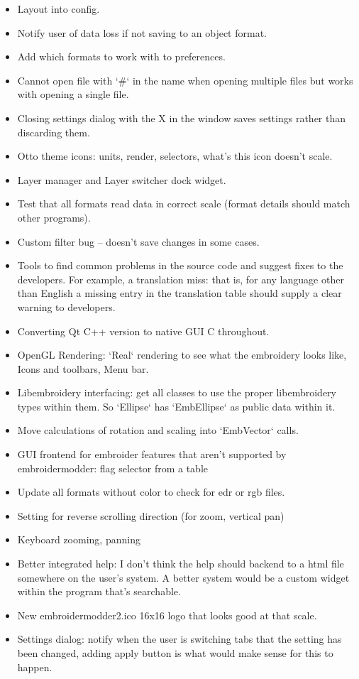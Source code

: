 \documentclass[10pt]{report}
\begin{document}
\begin{itemize}
  \item Layout into config.
  \item Notify user of data loss if not saving to an object format.
  \item Add which formats to work with to preferences.
  \item Cannot open file with `\#` in the name when opening multiple files but works with opening a single file.
  \item Closing settings dialog with the X in the window saves settings rather than discarding them.
  \item Otto theme icons: units, render, selectors, what's this icon doesn't scale.
  \item Layer manager and Layer switcher dock widget.
  \item Test that all formats read data in correct scale (format details should match other programs).
  \item Custom filter bug -- doesn't save changes in some cases.
  \item Tools to find common problems in the source code and suggest fixes to the developers. For example, a translation miss: that is, for any language other than English a missing entry in the translation table should supply a clear warning to developers.
  \item Converting Qt C++ version to native GUI C throughout.
  \item OpenGL Rendering: `Real` rendering to see what the embroidery looks like, Icons and toolbars, Menu bar.
  \item Libembroidery interfacing: get all classes to use the proper libembroidery types within them. So `Ellipse` has `EmbEllipse` as public data within it.
  \item Move calculations of rotation and scaling into `EmbVector` calls.
  \item GUI frontend for embroider features that aren't supported by embroidermodder: flag selector from a table
  \item Update all formats without color to check for edr or rgb files.
  \item Setting for reverse scrolling direction (for zoom, vertical pan)
  \item Keyboard zooming, panning
  \item Better integrated help: I don't think the help should backend to a html file somewhere on the user's system. A better system would be a custom widget within the program that's searchable.
  \item New embroidermodder2.ico 16x16 logo that looks good at that scale.
  \item Settings dialog: notify when the user is switching tabs that the setting has been changed, adding apply button is what would make sense for this to happen.
\end{itemize}
\end{document}
